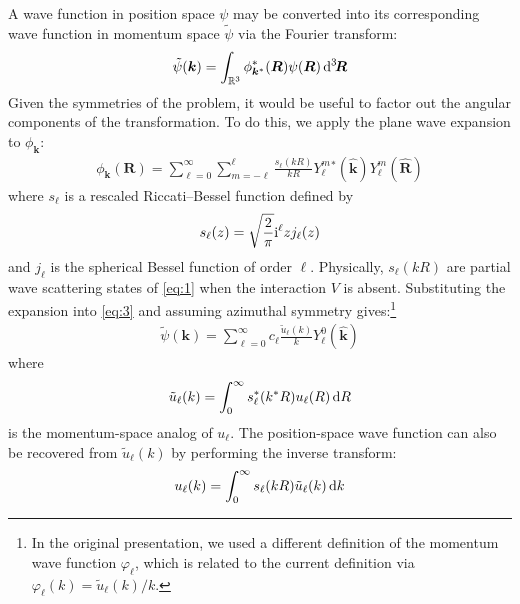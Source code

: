 \documentclass[amsmath, amssymb, aps, floatfix, nofootinbib, preprintnumbers,
  showpacs, superscriptaddress, twocolumn]{revtex4-1}
\begin{document}
A wave function in position space $\psi$ may be converted into its
corresponding wave function in momentum space $\tilde \psi$ via the Fourier
transform:
\begin{align} \label{eq:3}
  \tilde \psi(\bm k) =
  \int_{\mathbb R^3} \phi^*_{\bm k^*}(\bm R) \psi(\bm R) \operatorname{d \!}\mathord{}^3\!\bm R
\end{align}
Given the symmetries of the problem, it would be useful to factor out the
angular components of the transformation.  To do this, we apply the plane wave
expansion to $\phi_{\bm k}$:\cite{Mehrem2011}
\begin{align*}
  \phi_{\bm k}(\bm R) = \sum_{\ell = 0}^\infty \sum_{m = -\ell}^\ell
  \frac{s_\ell(k R)}{k R} Y_\ell^m{}^*(\hat{\bm k}) Y_\ell^m(\hat{\bm R})
\end{align*}
where $s_\ell$ is a rescaled Riccati--Bessel function defined by
\begin{align*}
  s_\ell(z) = \sqrt{\frac{2}{\pi}} \mathrm{i}^\ell z j_\ell(z)
\end{align*}
and $j_\ell$ is the spherical Bessel function of order $\ell$.  Physically,
$s_\ell(k R)$ are partial wave scattering states of \eqref{eq:1} when the
interaction $V$ is absent.  Substituting the expansion into \eqref{eq:3} and
assuming azimuthal symmetry gives:\footnote{In the original presentation, we
  used a different definition of the momentum wave function $\varphi_\ell$,
  which is related to the current definition via
  $\varphi_\ell(k) = \tilde u_\ell(k) / k$.}
\begin{align*}
  \tilde \psi(\bm k) =
  \sum_{\ell = 0}^\infty c_\ell \frac{\tilde u_\ell(k)}{k} Y_\ell^0(\hat{\bm k})
\end{align*}
where
\begin{align*}
  \tilde u_\ell(k) = \int_0^\infty s^*_\ell(k^* R) u_\ell(R) \operatorname{d \!}\mathord{} R
\end{align*}
is the momentum-space analog of $u_\ell$.  The position-space wave function
can also be recovered from $\tilde u_\ell(k)$ by performing the inverse
transform:
\begin{align*}
  u_\ell(k) = \int_0^\infty s_\ell(k R) \tilde u_\ell(k) \operatorname{d \!}\mathord{} k
\end{align*}
\end{document}
